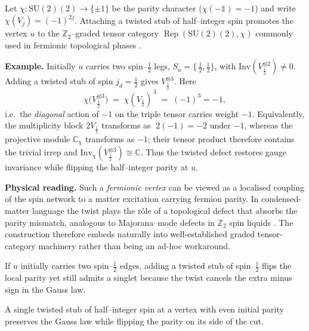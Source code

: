 \documentclass[11pt]{article}
\newcommand{\SU}{\mathrm{SU}(2)}
\newcommand{\Inv}{\mathrm{Inv}}
\begin{document}
\begin{remark}
  \label{rem:twistedGauss}
  Let $\chi\colon\SU(2)\!\to\!\{\pm1\}$ be the parity character
  ($\chi(-\mathbb 1)=-1$) and write
  $\chi(V_j)=(-1)^{2j}$.
  Attaching a twisted stub of half–integer spin
  promotes the vertex $u$ to the $\mathbb Z_2$–graded tensor
  category $\operatorname{Rep}(\SU(2),\chi)$ commonly used in fermionic
  topological phases \cite[Sec.\,2]{Kitaev2006}.

  \medskip\noindent
  \textbf{Example.}
  Initially $u$ carries two spin–$\tfrac12$ legs,
  $S_u=\{\,\tfrac12,\tfrac12\}$, with
  $\Inv(V_{\tfrac12}^{\otimes2})\neq0$.
  Adding a twisted stub of spin
  $j_d=\tfrac12$ gives $V_{\tfrac12}^{\otimes3}$.
  Here
  \[
    \chi\!\bigl(V_{\tfrac12}^{\otimes3}\bigr)
    \;=\;
    \chi(V_{\tfrac12})^{\,3}
    \;=\;
    (-1)^{3}
    =-1,
  \]
  i.e.\ the \emph{diagonal} action of $-1$ on the triple tensor
  carries weight $-1$.  Equivalently, the multiplicity block
  $2V_{\tfrac12}$ transforms as $\;2(-1)=-2$ under $-1$,
  whereas the projective module
  $\mathbb C_{\chi}$ transforms as $-1$;
  their tensor product therefore contains the trivial irrep and
  \(
    \Inv_{\chi}(V_{\tfrac12}^{\otimes3})\cong\mathbb C.
  \)
  Thus the twisted defect restores gauge invariance while flipping the
  half–integer parity at $u$.

  \medskip
  \textbf{Physical reading.}
  Such a \emph{fermionic vertex} can be viewed as a localised coupling of
  the spin network to a matter excitation carrying fermion parity.
  In condensed-matter language the twist plays the rôle of a
  topological defect that absorbs the parity mismatch, analogous to
  Majorana–mode defects in $\mathbb Z_2$ spin liquids
  \cite{GaiottoJohnsonFreyd2019}.  The construction therefore embeds naturally
  into well-established graded tensor-category machinery rather than being
  an ad-hoc workaround.
\end{remark}

\begin{example}\label{ex:defect}
  If $u$ initially carries two spin–$\tfrac12$ edges, adding a twisted stub
  of spin~$\tfrac12$ flips the local parity yet still admits a singlet
  because the twist cancels the extra minus sign in the Gauss law.
\end{example}

\begin{lemma}\label{lem:defectGauge}
  A single twisted stub of half–integer spin at a vertex with even initial
  parity preserves the Gauss law while flipping the parity on its side of
  the cut.
\end{lemma}
\end{document}
